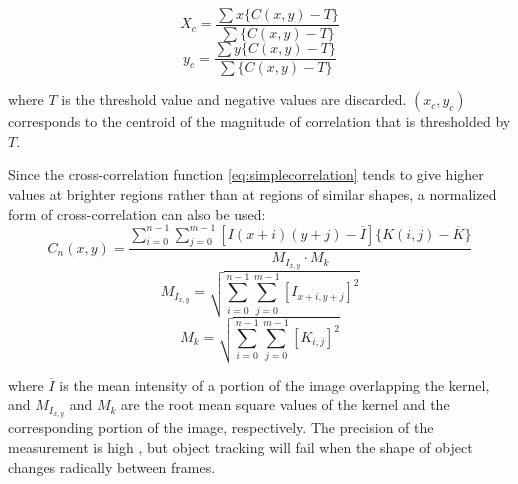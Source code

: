 \begin{equation}
X_{c}=\frac{\sum{x\{C(x,y)-T\}}}{\sum{\{C(x,y)-T\}}}
\end{equation}
\begin{equation}
y_{c}=\frac{\sum{y\{C(x,y)-T\}}}{\sum{\{C(x,y)-T\}}}
\end{equation}

where $T$ is the threshold value and negative values are
discarded. 
 $(x_{c}, y_{c})$
 corresponds to the centroid of
the magnitude of correlation that is thresholded by $T$. 

Since the cross-correlation function \ref{eq:simplecorrelation} tends to give higher values at
brighter regions rather than at regions of similar shapes, a normalized
form of cross-correlation can also be used:
\begin{equation}
C_{n}(x,y)=\frac{\sum_{i=0}^{n-1}\sum_{j=0}^{m-1}[I(x+i)(y+j)-\overline{I}]\{K(i,j)-\overline{K}\}}{M_{I_{x,y}}\cdot M_{k}}
\end{equation}
\begin{equation}
M_{I_{x,y}}=\sqrt{\sum_{i=0}^{n-1}\sum_{j=0}^{m-1}[I_{x+i,y+j}]^{2}}
\end{equation}
\begin{equation}
M_{k}=\sqrt{\sum_{i=0}^{n-1}\sum_{j=0}^{m-1}[K_{i,j}]^{2}}
\end{equation}

where 
$\overline{I}$ is the mean intensity of a portion of the image overlapping the kernel,
and $M_{I_{x,y}}$ and
$M_{k}$ are the root mean square values of
the kernel and the corresponding portion of the image, respectively.
The precision of the measurement is high \citep{cheezumBJ2001}, but
object tracking will fail when the shape of object changes radically
between frames. 

